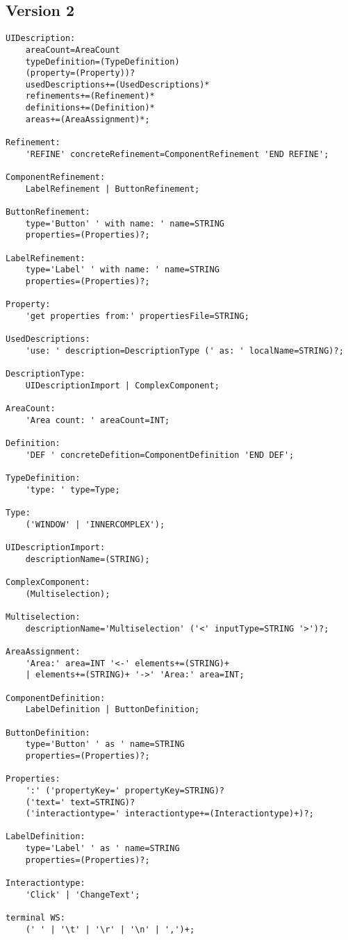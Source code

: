 \subsection*{Version 2}
\begin{lstlisting}
UIDescription:
	areaCount=AreaCount
	typeDefinition=(TypeDefinition)
	(property=(Property))?
	usedDescriptions+=(UsedDescriptions)*
	refinements+=(Refinement)*
	definitions+=(Definition)*
	areas+=(AreaAssignment)*;

Refinement:
	'REFINE' concreteRefinement=ComponentRefinement 'END REFINE';

ComponentRefinement:
	LabelRefinement | ButtonRefinement;

ButtonRefinement:
	type='Button' ' with name: ' name=STRING
	properties=(Properties)?;

LabelRefinement:
	type='Label' ' with name: ' name=STRING
	properties=(Properties)?;

Property:
	'get properties from:' propertiesFile=STRING;

UsedDescriptions:
	'use: ' description=DescriptionType (' as: ' localName=STRING)?;

DescriptionType:
	UIDescriptionImport | ComplexComponent;

AreaCount:
	'Area count: ' areaCount=INT;

Definition:
	'DEF ' concreteDefition=ComponentDefinition 'END DEF';

TypeDefinition:
	'type: ' type=Type;

Type:
	('WINDOW' | 'INNERCOMPLEX');

UIDescriptionImport:
	descriptionName=(STRING);

ComplexComponent:
	(Multiselection);

Multiselection:
	descriptionName='Multiselection' ('<' inputType=STRING '>')?;

AreaAssignment:
	'Area:' area=INT '<-' elements+=(STRING)+
	| elements+=(STRING)+ '->' 'Area:' area=INT;

ComponentDefinition:
	LabelDefinition | ButtonDefinition;

ButtonDefinition:
	type='Button' ' as ' name=STRING
	properties=(Properties)?;

Properties:
	':' ('propertyKey=' propertyKey=STRING)?
	('text=' text=STRING)?
	('interactiontype=' interactiontype+=(Interactiontype)+)?;

LabelDefinition:
	type='Label' ' as ' name=STRING
	properties=(Properties)?;

Interactiontype:
	'Click' | 'ChangeText';

terminal WS:
	(' ' | '\t' | '\r' | '\n' | ',')+;

\end{lstlisting}